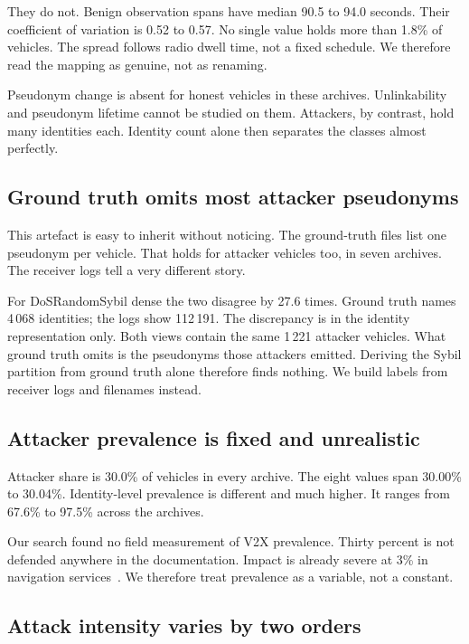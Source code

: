 \documentclass[conference]{IEEEtran}
\begin{document}
They do not.
Benign observation spans have median 90.5 to 94.0 seconds.
Their coefficient of variation is 0.52 to 0.57.
No single value holds more than 1.8\% of vehicles.
The spread follows radio dwell time, not a fixed schedule.
We therefore read the mapping as genuine, not as renaming.

Pseudonym change is absent for honest vehicles in these archives.
Unlinkability and pseudonym lifetime cannot be studied on them.
Attackers, by contrast, hold many identities each.
Identity count alone then separates the classes almost perfectly.

\subsection{Ground truth omits most attacker pseudonyms}

This artefact is easy to inherit without noticing.
The ground-truth files list one pseudonym per vehicle.
That holds for attacker vehicles too, in seven archives.
The receiver logs tell a very different story.

For DoSRandomSybil dense the two disagree by 27.6 times.
Ground truth names 4\,068 identities; the logs show 112\,191.
The discrepancy is in the identity representation only.
Both views contain the same 1\,221 attacker vehicles.
What ground truth omits is the pseudonyms those attackers emitted.
Deriving the Sybil partition from ground truth alone therefore finds nothing.
We build labels from receiver logs and filenames instead.

\subsection{Attacker prevalence is fixed and unrealistic}

Attacker share is 30.0\% of vehicles in every archive.
The eight values span 30.00\% to 30.04\%.
Identity-level prevalence is different and much higher.
It ranges from 67.6\% to 97.5\% across the archives.

Our search found no field measurement of V2X prevalence.
Thirty percent is not defended anywhere in the documentation.
Impact is already severe at 3\% in navigation services~\cite{soderhall2025}.
We therefore treat prevalence as a variable, not a constant.

\subsection{Attack intensity varies by two orders}
\end{document}
